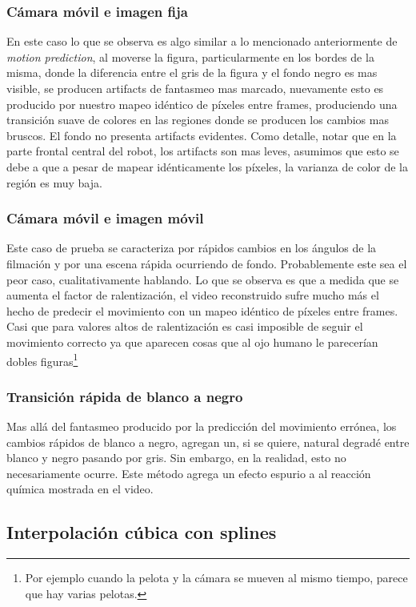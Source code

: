 \subsubsection{Cámara móvil e imagen fija}
En este caso lo que se observa es algo similar a lo mencionado anteriormente de \emph{motion prediction}, al moverse la figura, particularmente en los bordes de la misma, donde la diferencia entre el gris de la figura y el fondo negro es mas visible, se producen artifacts de fantasmeo mas marcado, nuevamente esto es producido por nuestro mapeo idéntico de píxeles entre frames, produciendo una transición suave de colores en las regiones donde se producen los cambios mas bruscos. El fondo no presenta artifacts evidentes. Como detalle, notar que en la parte frontal central del robot, los artifacts son mas leves, asumimos que esto se debe a que a pesar de mapear idénticamente los píxeles, la varianza de color de la región es muy baja.

\subsubsection{Cámara móvil e imagen móvil}
Este caso de prueba se caracteriza por rápidos cambios en los ángulos de la filmación y por una escena rápida ocurriendo de fondo. Probablemente este sea el peor caso, cualitativamente hablando. Lo que se observa es que a medida que se aumenta el factor de ralentización, el video reconstruido sufre mucho más el hecho de predecir el movimiento con un mapeo idéntico de píxeles entre frames. Casi que para valores altos de ralentización es casi imposible de seguir el movimiento correcto ya que aparecen cosas que al ojo humano le parecerían dobles figuras\footnote{Por ejemplo cuando la pelota y la cámara se mueven al mismo tiempo, parece que hay varias pelotas.}

\subsubsection{Transición rápida de blanco a negro}
Mas allá del fantasmeo producido por la predicción del movimiento errónea, los cambios rápidos de blanco a negro, agregan un, si se quiere, natural degradé entre blanco y negro pasando por gris. Sin embargo, en la realidad, esto no necesariamente ocurre. Este método agrega un efecto espurio a al reacción química mostrada en el video.


\subsection{Interpolación cúbica con splines}
